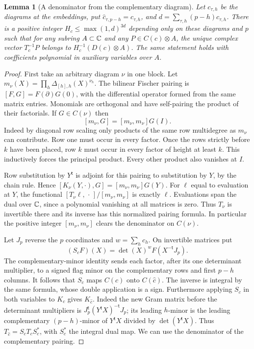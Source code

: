 \documentclass[a4paper,11pt]{article}
\newtheorem{lemma}[proposition]{Lemma}
\theoremstyle{definition}
\theoremstyle{remark}
\numberwithin{equation}{section}
\begin{document}
\begin{lemma}[A denominator from the complementary diagram]
\leavevmode\label{lem:complementfischer819}
Let \(c_{\tau,h}\) be the diagrams at the embeddings, put
\(\widehat c_{\tau,p-h}=c_{\tau,h}\), and
\(d=\sum_{\tau,h}(p-h)c_{\tau,h}\). There is a positive
integer \(H_c\le\max(1,d)^{3d}\) depending only on these
diagrams and \(p\) such that for any subring \(A\subset\mathbb C\)
and any \(P\in C(c)\otimes A\), the unique complex vector
\(T_c^{-1}P\) belongs to \(H_c^{-1}(D(c)\otimes A)\).
The same statement holds with coefficients polynomial
in auxiliary variables over \(A\).
\end{lemma}
\begin{proof}
First take an arbitrary diagram \(\nu\) in one block.
Let \(m_\nu(X)=\prod_h\Delta_{[h],h}(X)^{\nu_h}\).
The bilinear Fischer pairing is
\([F,G]=F(\partial)G(0)\), with the differential operator
formed from the same matrix entries. Monomials are
orthogonal and have self-pairing the product of their
factorials. If \(G\in C(\nu)\) then
\[
       [m_\nu,G]=[m_\nu,m_\nu]G(I).
\]
Indeed by diagonal row scaling only products of the
same row multidegree as \(m_\nu\) can contribute. Row one
must occur in every factor. Once the rows strictly
before \(k\) have been placed, row \(k\) must occur in
every factor of height at least \(k\). This inductively
forces the principal product. Every other product also
vanishes at \(I\).

Row substitution by \(Y^{\mathsf t}\) is adjoint for this
pairing to substitution by \(Y\), by the chain rule.
Hence \([K_\nu(Y,\cdot),G]=[m_\nu,m_\nu]G(Y)\).
For \(\ell\) equal to evaluation at \(Y\), the functional
\([T_\nu\ell,\,\cdot\,]/[m_\nu,m_\nu]\) is exactly \(\ell\).
Evaluations span the dual over \(\mathbb C\), since a polynomial
vanishing at all matrices is zero. Thus \(T_\nu\) is
invertible there and its inverse has this normalized
pairing formula. In particular the positive integer
\([m_\nu,m_\nu]\) clears the denominator on \(C(\nu)\).

Let \(J_p\) reverse the \(p\) coordinates and \(w=\sum_h c_h\).
On invertible matrices put
\[
        (S_cF)(X)=\det(X)^w F(X^{-\mathsf t}J_p).
\]
The complementary-minor identity sends each factor,
after its one determinant multiplier, to a signed flag
minor on the complementary rows and first \(p-h\) columns.
It follows that \(S_c\) maps \(C(c)\) onto \(C(\widehat c)\).
The inverse is integral by the same formula, whose double
application is a sign. Furthermore applying \(S_c\) in
both variables to \(K_c\) gives \(K_{\widehat c}\).
Indeed the new Gram matrix before the determinant multipliers
is \(J_p^{\mathsf t}(Y^{\mathsf t}X)^{-\mathsf t}J_p\);
its leading \(h\)-minor is the leading complementary
\((p-h)\)-minor of \(Y^{\mathsf t}X\) divided by
\(\det(Y^{\mathsf t}X)\). Thus \(T_{\widehat c}=S_c T_c S_c^*\),
with \(S_c^*\) the integral dual map. We can use the
denominator of the complementary pairing.


\end{proof}
\end{document}
